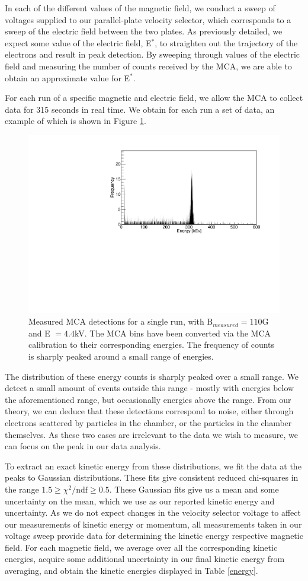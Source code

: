 In each of the different values of the magnetic field, we conduct a sweep of voltages supplied to our parallel-plate velocity selector, which corresponds to a sweep of the electric field between the two plates. As previously detailed, we expect some value of the electric field, E$^*$,  to straighten out the trajectory of the electrons and result in peak detection. By sweeping through values of the electric field and measuring the number of counts received by the MCA, we are able to obtain an approximate value for E$^*$.

For each run of a specific magnetic and electric field, we allow the MCA to collect data for 315 seconds in real time. We obtain for each run a set of data, an example of which is shown in Figure \ref{mca}.

\begin{figure}[h]
  \includegraphics[width=.5\textwidth]{mca-readout-clean.pdf}
  \caption{Measured MCA detections for a single run, with $\text{B}_{measured} = 110$G and E $ = 4.4$kV. The MCA bins have been converted via the MCA calibration to their corresponding energies. The frequency of counts is sharply peaked around a small range of energies.}
  \label{mca}
  \end{figure}
      
The distribution of these energy counts is sharply peaked over a small range. We detect a small amount of events outside this range - mostly with energies below the aforementioned range, but occasionally energies above the range. From our theory, we can deduce that these detections correspond to noise, either through electrons scattered by particles in the chamber, or the particles in the chamber themselves. As these two cases are irrelevant to the data we wish to measure, we can focus on the peak in our data analysis.

To extract an exact kinetic energy from these distributions, we fit the data at the peaks to Gaussian distributions. These fits give consistent reduced chi-squares in the range $1.5 \geq \chi^2/\text{ndf} \geq 0.5$. These Gaussian fits give us a mean and some uncertainty on the mean, which we use as our reported kinetic energy and uncertainty. As we do not expect changes in the velocity selector voltage to affect our measurements of kinetic energy or momentum, all measurements taken in our voltage sweep provide data for determining the kinetic energy respective magnetic field. For each magnetic field, we average over all the corresponding kinetic energies, acquire some additional uncertainty in our final kinetic energy from averaging, and obtain the kinetic energies displayed in Table \ref{energy}.


